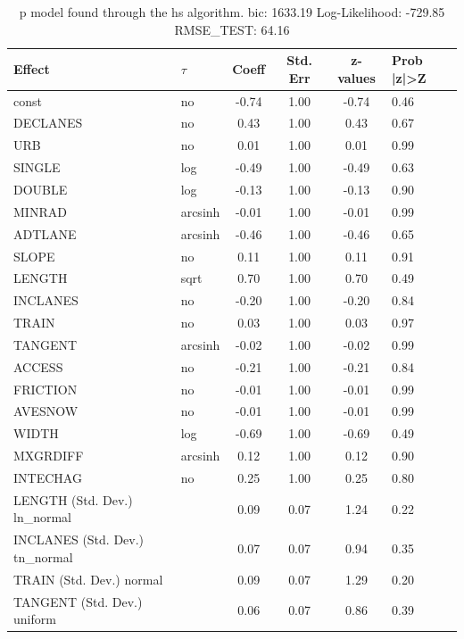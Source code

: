 \begin{table}
	\caption{p model found through the hs algorithm. bic: 1633.19 Log-Likelihood: -729.85 RMSE_TEST: 64.16}
	\begin{center}
		\begin{tabular}{|l|l|c|c|c|l|}
			\hline
			Effect & $\tau$ & Coeff & Std. Err & z-values & Prob |z|>Z \\
			\hline
			const & no & -0.74 & 1.00 & -0.74 & 0.46 \\
			\hline
			DECLANES & no & 0.43 & 1.00 & 0.43 & 0.67 \\
			\hline
			URB & no & 0.01 & 1.00 & 0.01 & 0.99 \\
			\hline
			SINGLE & log & -0.49 & 1.00 & -0.49 & 0.63 \\
			\hline
			DOUBLE & log & -0.13 & 1.00 & -0.13 & 0.90 \\
			\hline
			MINRAD & arcsinh & -0.01 & 1.00 & -0.01 & 0.99 \\
			\hline
			ADTLANE & arcsinh & -0.46 & 1.00 & -0.46 & 0.65 \\
			\hline
			SLOPE & no & 0.11 & 1.00 & 0.11 & 0.91 \\
			\hline
			LENGTH & sqrt & 0.70 & 1.00 & 0.70 & 0.49 \\
			\hline
			INCLANES & no & -0.20 & 1.00 & -0.20 & 0.84 \\
			\hline
			TRAIN & no & 0.03 & 1.00 & 0.03 & 0.97 \\
			\hline
			TANGENT & arcsinh & -0.02 & 1.00 & -0.02 & 0.99 \\
			\hline
			ACCESS & no & -0.21 & 1.00 & -0.21 & 0.84 \\
			\hline
			FRICTION & no & -0.01 & 1.00 & -0.01 & 0.99 \\
			\hline
			AVESNOW & no & -0.01 & 1.00 & -0.01 & 0.99 \\
			\hline
			WIDTH & log & -0.69 & 1.00 & -0.69 & 0.49 \\
			\hline
			MXGRDIFF & arcsinh & 0.12 & 1.00 & 0.12 & 0.90 \\
			\hline
			INTECHAG & no & 0.25 & 1.00 & 0.25 & 0.80 \\
			\hline
			LENGTH (Std. Dev.) ln_normal &  & 0.09 & 0.07 & 1.24 & 0.22 \\
			\hline
			INCLANES (Std. Dev.) tn_normal &  & 0.07 & 0.07 & 0.94 & 0.35 \\
			\hline
			TRAIN (Std. Dev.) normal &  & 0.09 & 0.07 & 1.29 & 0.20 \\
			\hline
			TANGENT (Std. Dev.) uniform &  & 0.06 & 0.07 & 0.86 & 0.39 \\

\end{tabular}
\end{center}
\end{table}

